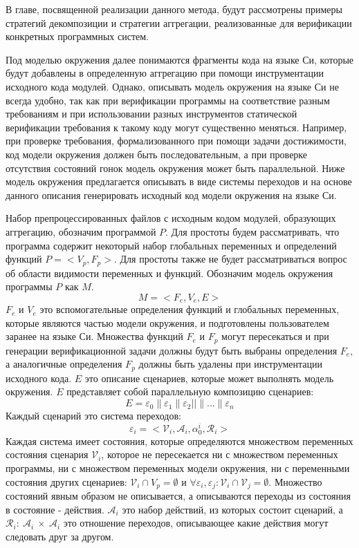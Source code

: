 \documentclass[%
candidate,     %
href,        %
colorlinks,  %
]{disser}
\begin{document}
В главе, посвященной реализации данного метода, будут рассмотрены примеры стратегий декомпозиции и стратегии аггрегации, реализованные для верификации конкретных программных систем.

Под моделью окружения далее понимаются фрагменты кода на языке Си, которые будут добавлены в определенную аггрегацию при помощи инструментации исходного кода модулей.
Однако, описывать модель окружения на языке Си не всегда удобно, так как при верификации программы на соответствие разным требованиям и при использовании разных инструментов статической верификации требования к такому коду могут существенно меняться.
Например, при проверке требования, формализованного при помощи задачи достижимости, код модели окружения должен быть последовательным, а при проверке отсутствия состояний гонок модель окружения может быть параллельной.
Ниже модель окружения предлагается описывать в виде системы переходов и на основе данного описания генерировать исходный код модели окружения на языке Си.

Набор препроцессированных файлов с исходным кодом модулей, образующих аггрегацию, обозначим программой $P$.
Для простоты будем рассматривать, что программа содержит некоторый набор глобальных переменных и определений функций $P = < V_p, F_p>$.
Для простоты также не будет рассматриваться вопрос об области видимости переменных и функций.
Обозначим модель окружения программы $P$ как $M$.
\[ M = <F_e, V_e, E > \]
$F_e$ и $V_e$ это вспомогательные определения функций и глобальных переменных, которые являются частью модели окружения, и подготовлены пользователем заранее на языке Си.
Множества функций $F_e$ и $F_p$ могут пересекаться и при генерации верификационной задачи должны будут быть выбраны определения $F_e$, а аналогичные определения $F_p$ должны быть удалены при инструментации исходного кода.
$E$ это описание сценариев, которые может выполнять модель окружения.
$E$ представляет собой параллельную композицию сценариев:
\[ E = \varepsilon_0 \parallel \varepsilon_1 \parallel \varepsilon_2 || \parallel ... \parallel \varepsilon_n \]
Каждый сценарий это система переходов:
\[ \varepsilon_i = <\mathcal{V}_i, \mathcal{A}_i, \alpha^i_0 ,\mathcal{R}_i>\]
Каждая система имеет состояния, которые определяются множеством переменных состояния сценария $\mathcal{V}_i$, которое не пересекается ни с множеством переменных программы, ни с множеством переменных модели окружения, ни с переменными состояния других сценариев:
$\mathcal{V}_i \cap V_p = \emptyset$ и $\forall \varepsilon_i, \varepsilon_j: \mathcal{V}_i \cap \mathcal{V}_j = \emptyset$.
Множество состояний явным образом не описывается, а описываются переходы из состояния в состояние - действия.
$\mathcal{A}_i$ это набор действий, из которых состоит сценарий, а $\mathcal{R}_i:~ \mathcal{A}_i~\times~\mathcal{A}_i$ это отношение переходов, описывающее какие действия могут следовать друг за другом.
\end{document}
